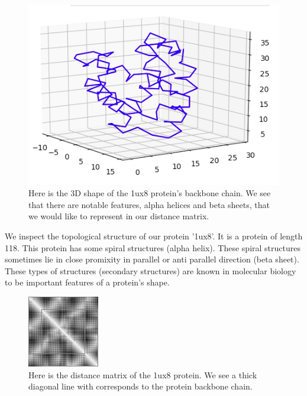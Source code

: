 \documentclass[12pt, a4paper, twocolumn, fullpage]{article}
\theoremstyle{plain}
\theoremstyle{definition}
\theoremstyle{remark}
\begin{document}
\begin{figure}[h]
    \includegraphics[width=\linewidth]{1ux8pdb.png}
    \caption{Here is the 3D shape of the  1ux8 protein's backbone chain. We see that there are notable features, alpha helices and beta sheets, that we would like to represent in our distance matrix.}
    \label{1ux8pdb}
\end{figure}

We inspect the topological structure of our protein '1ux8'. It is a protein of length 118. This protein has some spiral structures (alpha helix). These spiral structures sometimes lie in close promixity in parallel or anti parallel direction (beta sheet). These types of structures (secondary structures) are known in molecular biology to be important features of a protein's shape.

\begin{figure}[h]
    \centering
    \includegraphics[width=.7\linewidth]{1ux8matBase}
    \caption{Here is the distance matrix of the 1ux8 protein. We see a thick diagonal line with corresponds to the protein backbone chain.}
    \label{1ux8matBase}
\end{figure}
    
\end{document}

